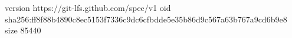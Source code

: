 version https://git-lfs.github.com/spec/v1
oid sha256:ff8f88b4890c8ec5153f7336c9dc6cfbdde5e35b86d9c567a63b767a9cd6b9e8
size 85440
